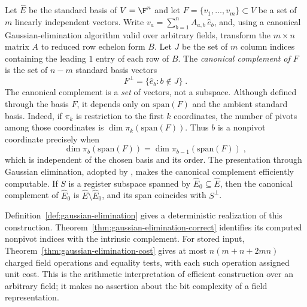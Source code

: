 \begin{definition}\label{def:canonical-complement}
  \leanok
	Let $\hat{E}$ be the standard basis of $V = \F^n$ and let
	$F = \{v_1, \dots, v_m\} \subset V$ be a set of $m$ linearly independent
	vectors. Write $v_a = \sum_{b=1}^n A_{a,b}\, \hat{e}_b$, and, using a
	canonical Gaussian-elimination algorithm valid over arbitrary fields,
	transform the $m \times n$ matrix $A$ to reduced row echelon form
	$B$. Let $J$ be the set of $m$ column indices containing the leading
	$1$ entry of each row of $B$. The \emph{canonical complement of $F$}
	is the set of $n - m$ standard basis vectors
	\[
		F^\perp = \{\hat{e}_b : b \notin J\}\;.
	\]
	The canonical complement is a \emph{set} of vectors, not a subspace.
	Although defined through the basis $F$, it depends only on
	$\mathrm{span}(F)$ and the ambient standard basis. Indeed, if $\pi_k$ is
	restriction to the first $k$ coordinates, the number of pivots among those
	coordinates is $\dim\pi_k(\mathrm{span}(F))$. Thus $b$ is a nonpivot
	coordinate precisely when
	\[
		\dim\pi_b(\mathrm{span}(F)) = \dim\pi_{b-1}(\mathrm{span}(F))\;,
	\]
	which is independent of the chosen basis and its order. The presentation
	through Gaussian elimination, adopted by \cite{Ji2020MIPStar}, makes the
	canonical complement efficiently computable. If $S$ is a register subspace
	spanned by $\hat{E}_0 \subseteq \hat{E}$, then the canonical complement of
	$\hat{E}_0$ is $\hat{E} \setminus \hat{E}_0$, and its span coincides with
	$S^\perp$.

  Definition~\ref{def:gaussian-elimination} gives a deterministic realization
  of this construction. Theorem~\ref{thm:gaussian-elimination-correct}
  identifies its computed nonpivot indices with the intrinsic complement.
  For stored input, Theorem~\ref{thm:gaussian-elimination-cost} gives at most
  $n(m+n+2mn)$ charged field operations and equality tests, with each such
  operation assigned unit cost. This is the arithmetic interpretation of
  efficient construction over an arbitrary field; it makes no assertion
  about the bit complexity of a field representation.
\end{definition}

